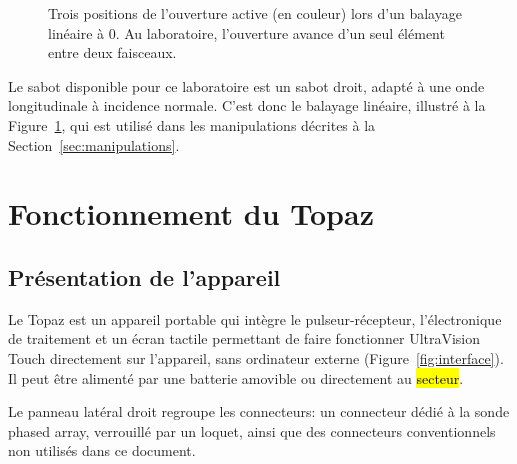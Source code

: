 \documentclass[11pt,letterpaper]{article}
\begin{document}
\begin{figure}[H]
\centering
{}
\caption{Trois positions de l'ouverture active (en couleur) lors d'un balayage lin\'eaire \`a 0\textdegree. Au laboratoire, l'ouverture avance d'un seul \'el\'ement entre deux faisceaux.}
\label{fig:e-scan}
\end{figure}

Le sabot disponible pour ce laboratoire est un sabot droit, adapt\'e \`a une onde longitudinale \`a incidence normale. C'est donc le balayage lin\'eaire, illustr\'e \`a la Figure~\ref{fig:e-scan}, qui est utilis\'e dans les manipulations d\'ecrites \`a la Section~\ref{sec:manipulations}.

\section{Fonctionnement du Topaz}

\subsection{Pr\'esentation de l'appareil}

Le Topaz est un appareil portable qui int\`egre le pulseur-r\'ecepteur, l'\'electronique de traitement et un \'ecran tactile permettant de faire fonctionner UltraVision Touch directement sur l'appareil, sans ordinateur externe (Figure~\ref{fig:interface}). Il peut \^etre aliment\'e par une batterie amovible ou directement au \hl{secteur}. %

Le panneau lat\'eral droit regroupe les connecteurs: un connecteur d\'edi\'e \`a la sonde phased array, verrouill\'e par un loquet, ainsi que des connecteurs conventionnels non utilis\'es dans ce document.
\end{document}
